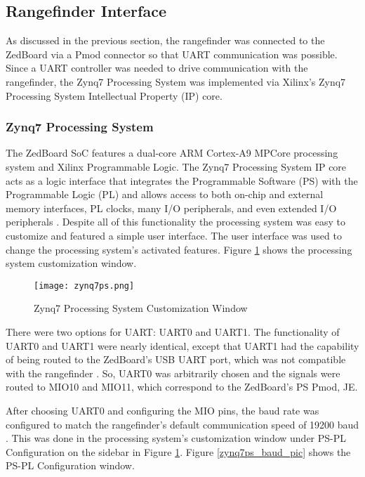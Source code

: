 \subsection{Rangefinder Interface}
As discussed in the previous section, the rangefinder was connected to the ZedBoard via a Pmod connector so that UART communication was possible. Since a UART controller was needed to drive communication with the rangefinder, the Zynq7 Processing System was implemented via Xilinx's Zynq7 Processing System Intellectual Property (IP) core.

\subsubsection{Zynq7 Processing System}
\label{zynq7processingsystem}
The ZedBoard SoC features a dual-core ARM Cortex-A9 MPCore processing system and Xilinx Programmable Logic. The Zynq7 Processing System IP core acts as a logic interface that integrates the Programmable Software (PS) with the Programmable Logic (PL) and allows access to both on-chip and external memory interfaces, PL clocks, many I/O peripherals, and even extended I/O peripherals \cite{zynq7ps}. Despite all of this functionality the processing system was easy to customize and featured a simple user interface. The user interface was used to change the processing system's activated features. Figure \ref{zynq7ps_pic} shows the processing system customization window.

\begin{figure}[H]
	\centerline{\texttt{[image: zynq7ps.png]}}
	\caption{Zynq7 Processing System Customization Window \cite{zynq7ps}}
	\label{zynq7ps_pic}
\end{figure}

There were two options for UART: UART0 and UART1. The functionality of UART0 and UART1 were nearly identical, except that UART1 had the capability of being routed to the ZedBoard's USB UART port, which was not compatible with the rangefinder \cite{zedboard_datasheet}. So, UART0 was arbitrarily chosen and the signals were routed to MIO10 and MIO11, which correspond to the ZedBoard's PS Pmod, JE.
\par
After choosing UART0 and configuring the MIO pins, the baud rate was configured to match the rangefinder's default communication speed of 19200 baud \cite{urg04lx_datasheet}. This was done in the processing system's customization window under PS-PL Configuration on the sidebar in Figure \ref{zynq7ps_pic}. Figure \ref{zynq7ps_baud_pic} shows the PS-PL Configuration window.

